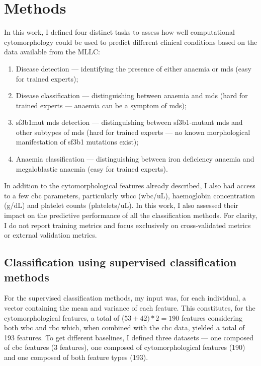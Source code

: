 \section{Methods}

In this work, I defined four distinct tasks to assess how well computational cytomorphology could be used to predict different clinical conditions based on the data available from the MLLC:

\begin{enumerate}
    \item Disease detection --- identifying the presence of either anaemia or \ac{mds} (easy for trained experts);
    \item Disease classification --- distinguishing between anaemia and \ac{mds} (hard for trained experts --- anaemia can be a symptom of \ac{mds});
    \item \ac{sf3b1}mut \ac{mds} detection --- distinguishing between \ac{sf3b1}-mutant \ac{mds} and other subtypes of \ac{mds} (hard for trained experts --- no known morphological manifestation of \ac{sf3b1} mutations exist);
    \item Anaemia classification --- distinguishing between iron deficiency anaemia and megaloblastic anaemia (easy for trained experts).
\end{enumerate}

In addition to the cytomorphological features already described, I also had access to a few \ac{cbc} parameters, particularly \ac{wbcc} (\ac{wbc}/uL), haemoglobin concentration (g/dL) and platelet counts (platelets/uL). In this work, I also assessed their impact on the predictive performance of all the classification methods. For clarity, I do not report training metrics and focus exclusively on cross-validated metrics or external validation metrics.

\subsection{Classification using supervised classification methods}

For the supervised classification methods, my input was, for each individual, a vector containing the mean and variance of each feature. This constitutes, for the cytomorphological features, a total of ($53 + 42) * 2 = 190$ features considering both \ac{wbc} and \ac{rbc} which, when combined with the \ac{cbc} data, yielded a total of 193 features. To get different baselines, I defined three datasets --- one composed of \ac{cbc} features (3 features), one composed of cytomorphological features (190) and one composed of both feature types (193). 

